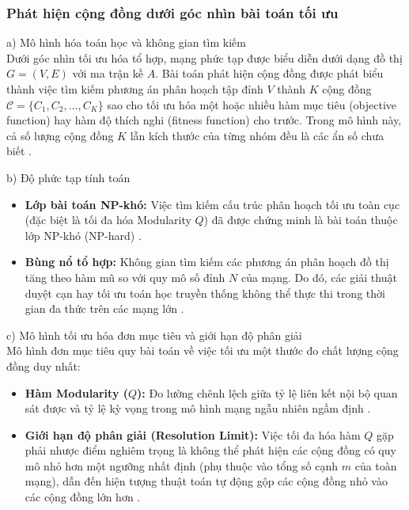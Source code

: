 \documentclass[14pt,a4paper]{extarticle}
\begin{document}
\subsubsection{Phát hiện cộng đồng dưới góc nhìn bài toán tối ưu}

\noindent a) Mô hình hóa toán học và không gian tìm kiếm
\\ \indent
Dưới góc nhìn tối ưu hóa tổ hợp, mạng phức tạp được biểu diễn dưới dạng đồ thị $G=(V,E)$ với ma trận kề $A$. Bài toán phát hiện cộng đồng được phát biểu thành việc tìm kiếm phương án phân hoạch tập đỉnh $V$ thành $K$ cộng đồng $\mathcal{C} = \{C_1, C_2, \dots, C_K\}$ sao cho tối ưu hóa một hoặc nhiều hàm mục tiêu (objective function) hay hàm độ thích nghi (fitness function) cho trước. Trong mô hình này, cả số lượng cộng đồng $K$ lẫn kích thước của từng nhóm đều là các ẩn số chưa biết \cite{Beldi2025}.

\noindent b) Độ phức tạp tính toán
\begin{itemize}
    \item \textbf{Lớp bài toán NP-khó:} Việc tìm kiếm cấu trúc phân hoạch tối ưu toàn cục (đặc biệt là tối đa hóa Modularity $Q$) đã được chứng minh là bài toán thuộc lớp NP-khó (NP-hard) \cite{Fortunato2010}.
    \item \textbf{Bùng nổ tổ hợp:} Không gian tìm kiếm các phương án phân hoạch đồ thị tăng theo hàm mũ so với quy mô số đỉnh $N$ của mạng. Do đó, các giải thuật duyệt cạn hay tối ưu toán học truyền thống không thể thực thi trong thời gian đa thức trên các mạng lớn \cite{Baraa2021, Gong2016}.
\end{itemize}

\noindent c) Mô hình tối ưu hóa đơn mục tiêu và giới hạn độ phân giải
\\ \indent
Mô hình đơn mục tiêu quy bài toán về việc tối ưu một thước đo chất lượng cộng đồng duy nhất:
\begin{itemize}
    \item \textbf{Hàm Modularity ($Q$):} Đo lường chênh lệch giữa tỷ lệ liên kết nội bộ quan sát được và tỷ lệ kỳ vọng trong mô hình mạng ngẫu nhiên ngầm định \cite{Beldi2025}.
    \item \textbf{Giới hạn độ phân giải (Resolution Limit):} Việc tối đa hóa hàm $Q$ gặp phải nhược điểm nghiêm trọng là không thể phát hiện các cộng đồng có quy mô nhỏ hơn một ngưỡng nhất định (phụ thuộc vào tổng số cạnh $m$ của toàn mạng), dẫn đến hiện tượng thuật toán tự động gộp các cộng đồng nhỏ vào các cộng đồng lớn hơn \cite{Gong2016}.
\end{itemize}
\end{document}

